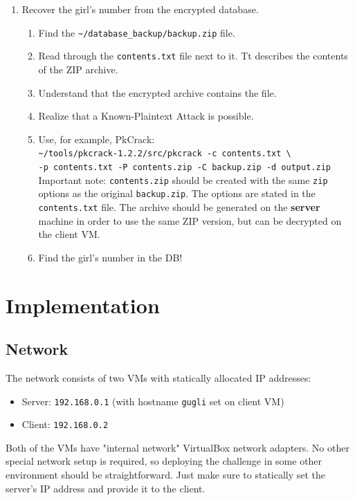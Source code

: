 \documentclass[11pt, a4paper]{article}
\begin{document}
\begin{enumerate}
      \item Recover the girl's number from the encrypted database.
        \begin{enumerate}
          \item Find the \texttt{\textasciitilde/database\_backup/backup.zip} file.
          \item Read through the \texttt{contents.txt} file next to it.
            Tt describes the contents of the ZIP archive.
          \item Understand that the encrypted archive contains the file.
          \item Realize that a Known-Plaintext Attack is possible.
          \item Use, for example, PkCrack:\\
            \texttt{\textasciitilde/tools/pkcrack-1.2.2/src/pkcrack -c contents.txt \textbackslash}\\
            \texttt{-p contents.txt -P contents.zip -C backup.zip -d output.zip}\\
            Important note: \texttt{contents.zip} should be created with the same \texttt{zip}
            options as the original \texttt{backup.zip}. The options are stated
            in the \texttt{contents.txt} file. The archive should be generated on the
            \textbf{server} machine in order to use the same ZIP version,
            but can be decrypted on the client VM.
          \item Find the girl's number in the DB!
        \end{enumerate}

\end{enumerate}


\section{Implementation}

\subsection{Network}
  The network consists of two VMs with statically allocated IP addresses:
  \begin{itemize}
    \item Server: \texttt{192.168.0.1} (with hostname \texttt{gugli} set on client VM)
    \item Client: \texttt{192.168.0.2}
  \end{itemize}
  Both of the VMs have "internal network" VirtualBox network adapters. No other
  special network setup is required, so deploying the challenge in some other
  environment should be straightforward. Just make sure to statically set the
  server's IP address and provide it to the client.
\end{document}
